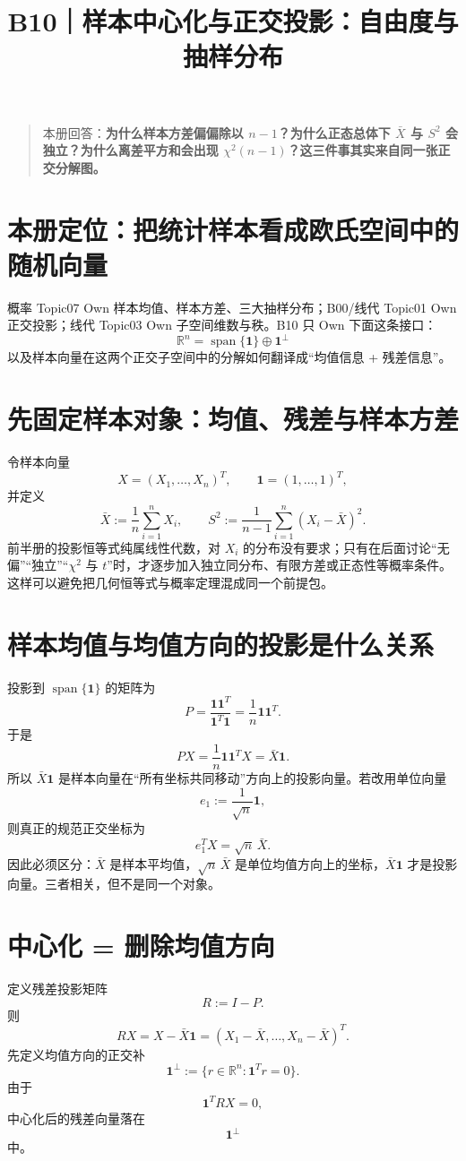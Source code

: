 \documentclass[profile=standard]{ipara-handbook}
\title{B10｜样本中心化与正交投影：自由度与抽样分布}
\author{}
\date{}
\begin{document}
\maketitle

\begin{quote}
本册回答：\textbf{为什么样本方差偏偏除以 $n-1$？为什么正态总体下 $\bar X$ 与 $S^2$ 会独立？为什么离差平方和会出现 $\chi^2(n-1)$？这三件事其实来自同一张正交分解图。}
\end{quote}

\section{本册定位：把统计样本看成欧氏空间中的随机向量}
概率 Topic07 Own 样本均值、样本方差、三大抽样分布；B00/线代 Topic01 Own 正交投影；线代 Topic03 Own 子空间维数与秩。B10 只 Own 下面这条接口：
\[
\boxed{
\mathbb R^n
=\operatorname{span}\{\mathbf1\}
\oplus
\mathbf1^\perp
}
\]
以及样本向量在这两个正交子空间中的分解如何翻译成“均值信息 + 残差信息”。

\section{先固定样本对象：均值、残差与样本方差}
令样本向量
\[
X=(X_1,\dots,X_n)^T,
\qquad
\mathbf1=(1,\dots,1)^T,
\]
并定义
\[
\bar X:=\frac1n\sum_{i=1}^nX_i,
\qquad
S^2:=\frac1{n-1}\sum_{i=1}^n(X_i-\bar X)^2.
\]
前半册的投影恒等式纯属线性代数，对 $X_i$ 的分布没有要求；只有在后面讨论“无偏”“独立”“$\chi^2$ 与 $t$”时，才逐步加入独立同分布、有限方差或正态性等概率条件。这样可以避免把几何恒等式与概率定理混成同一个前提包。

\section{样本均值与均值方向的投影是什么关系}
投影到 $\operatorname{span}\{\mathbf1\}$ 的矩阵为
\[
P=\frac{\mathbf1\mathbf1^T}{\mathbf1^T\mathbf1}
=\frac1n\mathbf1\mathbf1^T.
\]
于是
\[
PX
=\frac1n\mathbf1\mathbf1^TX
=\bar X\mathbf1.
\]
所以 $\bar X\mathbf1$ 是样本向量在“所有坐标共同移动”方向上的投影向量。若改用单位向量
\[
e_1:=\frac1{\sqrt n}\mathbf1,
\]
则真正的规范正交坐标为
\[
e_1^TX=\sqrt n\,\bar X.
\]
因此必须区分：$\bar X$ 是样本平均值，$\sqrt n\,\bar X$ 是单位均值方向上的坐标，$\bar X\mathbf1$ 才是投影向量。三者相关，但不是同一个对象。

\section{中心化 = 删除均值方向}
定义残差投影矩阵
\[
R:=I-P.
\]
则
\[
RX=X-\bar X\mathbf1
=(X_1-\bar X,\dots,X_n-\bar X)^T.
\]
先定义均值方向的正交补
\[
\mathbf1^\perp:=\{r\in\mathbb R^n:\mathbf1^Tr=0\}.
\]
由于
\[
\mathbf1^T RX=0,
\]
中心化后的残差向量落在
\[
\boxed{\mathbf1^\perp}
\]
中。
\end{document}
